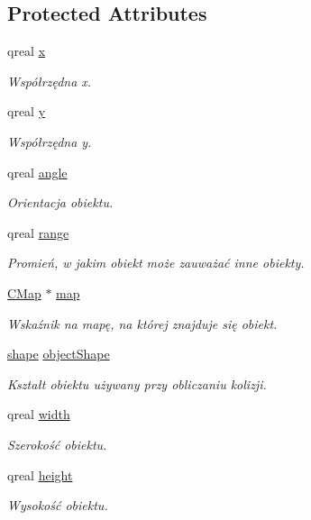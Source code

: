 \subsection*{Protected Attributes}
\begin{DoxyCompactItemize}
\item 
qreal \mbox{\hyperlink{class_c_object_acb23178c7b65e6cf37f9ab95128cd8d2}{x}}
\begin{DoxyCompactList}\small\item\em Współrzędna x. \end{DoxyCompactList}\item 
qreal \mbox{\hyperlink{class_c_object_a22fd03bdf2bc5c7058e4c2a9c9237c64}{y}}
\begin{DoxyCompactList}\small\item\em Współrzędna y. \end{DoxyCompactList}\item 
qreal \mbox{\hyperlink{class_c_object_a9ac381be23878447d48800b16d773efa}{angle}}
\begin{DoxyCompactList}\small\item\em Orientacja obiektu. \end{DoxyCompactList}\item 
qreal \mbox{\hyperlink{class_c_object_a0d3f8546df4d7620602646e7661d905e}{range}}
\begin{DoxyCompactList}\small\item\em Promień, w jakim obiekt może zauważać inne obiekty. \end{DoxyCompactList}\item 
\mbox{\hyperlink{class_c_map}{C\+Map}} $\ast$ \mbox{\hyperlink{class_c_object_a958cfe5f141fdab246af5da849f98d07}{map}}
\begin{DoxyCompactList}\small\item\em Wskaźnik na mapę, na której znajduje się obiekt. \end{DoxyCompactList}\item 
\mbox{\hyperlink{cobject_8h_a45cde9abb508c62d67c3bb2b9bf566a5}{shape}} \mbox{\hyperlink{class_c_object_a97a0d16c78ba0afc53f6df41055e6d94}{object\+Shape}}
\begin{DoxyCompactList}\small\item\em Kształt obiektu używany przy obliczaniu kolizji. \end{DoxyCompactList}\item 
qreal \mbox{\hyperlink{class_c_object_a6fceaa9b662c540109880306373fef4a}{width}}
\begin{DoxyCompactList}\small\item\em Szerokość obiektu. \end{DoxyCompactList}\item 
qreal \mbox{\hyperlink{class_c_object_a80f942a5fb6676096b7ab105842a6bd3}{height}}
\begin{DoxyCompactList}\small\item\em Wysokość obiektu. \end{DoxyCompactList}\end{DoxyCompactItemize}


